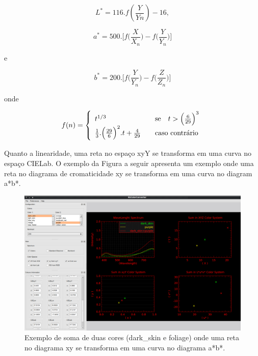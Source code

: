 \begin{equation}\label{eq:L*a*b*_L*}
L^*=116.f(\frac{Y}{Yn})-16,
\end{equation}

\begin{equation}\label{eq:L*a*b*_a*}
a^*=500.\Big[f\Big(\frac{X}{X_n}\Big)-f\Big(\frac{Y}{Y_n}\Big)\Big]
\end{equation}

e

\begin{equation}\label{eq:L*a*b*_b*}
b^*=200.\Big[f\Big(\frac{Y}{Y_n}\Big)-f\Big(\frac{Z}{Z_n}\Big)\Big]
\end{equation}

onde

\[
f(n) = \left\{ 
  \begin{array}{l l}
    t^{1/3} & \quad \text{se} \quad t > \Big(\frac{6}{29}\Big)^3\\
    \frac{1}{3}.\Big(\frac{29}{6}\Big)^2.t+\frac{4}{29} & 
\quad \text{caso contrário}\\
  \end{array} \right.
\]

\par
Quanto a linearidade, uma reta no espaço xyY se transforma em uma curva no
espaço CIELab. O exemplo da Figura a seguir apresenta um exemplo onde uma reta
no diagrama de cromaticidade xy se transforma em uma curva no diagram a*b*.

\begin{figure}[!htb]
     \centering
     \includegraphics[scale=0.6]{img/luv_no_linearity.png}
     \caption{Exemplo de soma de duas cores (dark_skin e foliage) onde uma reta
no diagrama xy se transforma em uma curva no diagrama a*b*.}
     \label{fig:luv_no_linearity}
\end{figure}

